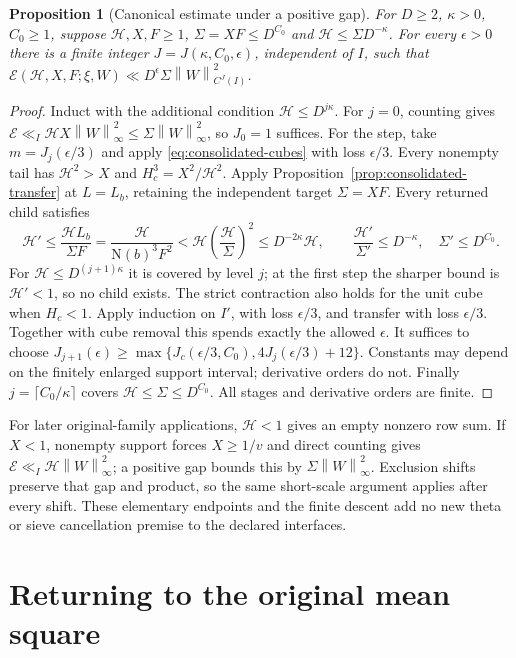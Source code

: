 \documentclass[11pt]{article}
\numberwithin{equation}{section}
\newtheorem{proposition}[theorem]{Proposition}
\theoremstyle{definition}
\theoremstyle{remark}
\newcommand{\E}{\mathcal E}
\newcommand{\N}{\mathrm N}
\newcommand{\norm}[1]{\left\|#1\right\|}
\begin{document}
\begin{proposition}[Canonical estimate under a positive gap]
\label{prop:canonical-audit}
For $D\ge2$, $\kappa>0$, $C_0\ge1$, suppose $\mathcal H,X,F\ge1$,
$\Sigma=XF\le D^{C_0}$ and $\mathcal H\le\Sigma D^{-\kappa}$.
For every $\epsilon>0$ there is a finite integer $J=J(\kappa,C_0,\epsilon)$,
independent of $I$, such that
$\E(\mathcal H,X,F;\xi,W)\ll
D^\epsilon\Sigma\norm{W}_{C^J(I)}^2$.
\end{proposition}
\begin{proof}
Induct with the additional condition $\mathcal H\le D^{j\kappa}$.
For $j=0$, counting gives $\E\ll_I\mathcal HX\norm{W}_\infty^2
\le\Sigma\norm{W}_\infty^2$, so $J_0=1$ suffices.
For the step, take $m=J_j(\epsilon/3)$ and apply
\eqref{eq:consolidated-cubes} with loss $\epsilon/3$.
Every nonempty tail has $\mathcal H^2>X$ and $H_c^3=X^2/\mathcal H^2$.
Apply Proposition~\ref{prop:consolidated-transfer} at $L=L_b$, retaining
the independent target $\Sigma=XF$. Every returned child satisfies
\[
 \mathcal H'\le\frac{\mathcal HL_b}{\Sigma F}
 =\frac{\mathcal H}{\N(b)^3F^2}
 <\mathcal H\left(\frac{\mathcal H}{\Sigma}\right)^2
 \le D^{-2\kappa}\mathcal H,\qquad
 \frac{\mathcal H'}{\Sigma'}\le D^{-\kappa},\quad\Sigma'\le D^{C_0}.
\]
For $\mathcal H\le D^{(j+1)\kappa}$ it is covered by level $j$;
at the first step the sharper bound is $\mathcal H'<1$, so no child exists.
The strict contraction also holds for the unit cube when $H_c<1$.
Apply induction on $I'$, with loss $\epsilon/3$, and transfer with loss
$\epsilon/3$. Together with cube removal this spends exactly the allowed
$\epsilon$. It suffices to choose
$J_{j+1}(\epsilon)\ge\max\{J_c(\epsilon/3,C_0),4J_j(\epsilon/3)+12\}$.
Constants may depend on the finitely enlarged support interval; derivative
orders do not. Finally $j=\lceil C_0/\kappa\rceil$ covers
$\mathcal H\le\Sigma\le D^{C_0}$. All stages and derivative orders are finite.
\end{proof}

For later original-family applications, $\mathcal H<1$ gives an empty
nonzero row sum. If $X<1$, nonempty support forces $X\ge1/v$ and direct
counting gives $\E\ll_I\mathcal H\norm{W}_\infty^2$; a positive gap bounds
this by $\Sigma\norm{W}_\infty^2$. Exclusion shifts preserve that gap and
product, so the same short-scale argument applies after every shift.
These elementary endpoints and the finite descent add no new theta or
sieve cancellation premise to the declared interfaces.


\section{Returning to the original mean square}\label{sec:moment-final}
\end{document}
